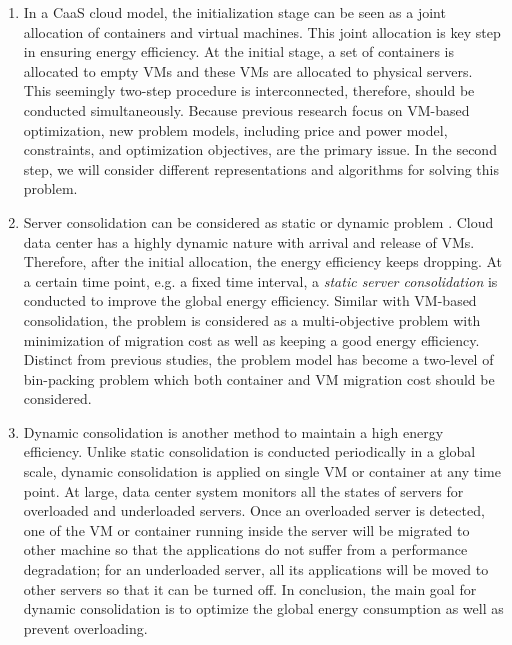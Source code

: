 \begin{enumerate}
\item In a CaaS cloud model, the initialization stage can be seen as a joint allocation of containers and virtual machines. This joint allocation is key step in ensuring energy efficiency.
At the initial stage, a set of containers is allocated to empty VMs and these VMs are allocated to physical servers. This seemingly two-step procedure is interconnected, therefore, should be conducted simultaneously. Because previous research \cite{Jennings:2015ht} focus on VM-based optimization, new problem models, including price and power model, constraints, and optimization objectives,  are the primary issue. In the second step, we will consider different representations and algorithms for solving this problem.

\item Server consolidation can be considered as static or dynamic problem \cite{Xiao:2015ik}.
Cloud data center has a highly dynamic nature with arrival and release of VMs. Therefore, 
after the initial allocation, the energy efficiency keeps dropping.  At a certain time point, e.g. a fixed time interval, a \emph{static server consolidation} is conducted to improve the global energy efficiency. Similar with VM-based consolidation, the problem is considered as a multi-objective problem with minimization of migration cost as well as keeping a good energy efficiency. Distinct from previous studies, the problem model has become a two-level of bin-packing problem which both container and VM migration cost should be considered.  
\item Dynamic consolidation is another method to maintain a high energy efficiency. Unlike static consolidation is conducted periodically in a global scale, dynamic consolidation is applied on single VM or container at any time point.  At large, data center system monitors all the states of servers for overloaded and underloaded servers. Once an overloaded server is detected, one of the VM or container running inside the server will be migrated to other machine so that the applications do not suffer from a performance degradation; for an underloaded server, all its applications will be moved to other servers so that it can be turned off. In conclusion, the main goal for dynamic consolidation is to optimize the global energy consumption as well as prevent overloading.

\end{enumerate}
